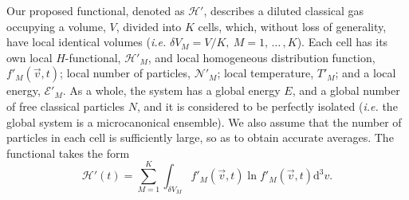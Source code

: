 Our proposed functional, denoted as $\mathcal{H}'$, describes a diluted classical
gas occupying a volume, $V$,
divided into $K$ cells, which, without loss of generality,
have local identical volumes (\textit{i.e.} $\delta V_M = V/K,\ M=1,\,\dots\,,K$).
Each cell has its own local
$H$-functional, $\mathcal{H}'_M$, and local homogeneous distribution function,
$f'_{M}(\vec{v},t)$; local number of particles, $\mathcal{N}'_M$;
local temperature, $T'_M$; and a local energy, $\mathcal{E}'_M$. As a whole, the system has a
global energy $E$, and a global number of free
classical particles $N$, and it is considered to be perfectly isolated (\textit{i.e.} the
global system is a microcanonical ensemble). We also assume that the number of particles
in each cell is sufficiently large, so as to obtain accurate averages.
The functional takes the form
%
\begin{equation}\label{eq:CH2}
   \mathcal{H}'(t)=\sum_{M=1}^{K}\int_{\delta V_M} f'_M(\vec{v},t) \ln f'_M(\vec{v},t)\mathrm{d}^3v.
\end{equation}
%


